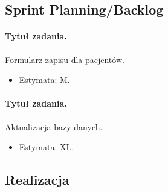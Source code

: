 \documentclass[a4paper]{article} \usepackage{polski} \usepackage[cp1250]{inputenc} \usepackage{url}
\begin{document}
\subsection{Sprint Planning/Backlog}
\label{Sprint2SPB}
\paragraph{Tytuł zadania.} Formularz zapisu dla pacjentów. \begin{itemize} \item Estymata: M. \end{itemize}

\paragraph{Tytuł zadania.} Aktualizacja bazy danych. \begin{itemize} \item Estymata: XL. \end{itemize}


\subsection{Realizacja}
\label{Realizacja2}
\end{document}

